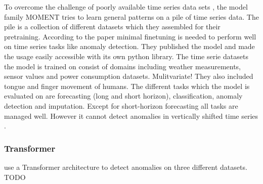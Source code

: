 \cite{han_learning_2022}

\cite{pham_mst-vae_2022}

\cite{mou_deep_2023}

\cite{kieu_anomaly_2022}

\cite{thill_temporal_2021}

\cite{wang_multiscale_2023}

\cite{chen_adversarial_2023}

\cite{gao_tsmae_2023}

\cite{gong_autoencoder-based_2022}

\cite{wang_attention-based_2022}

To overcome the challenge of poorly available time series data sets \cite{ma_survey_2023}, the model family MOMENT tries to learn general patterns on a pile of time series data. The pile is a collection of different datasets which they assembled for their pretraining. According to the paper minimal finetuning is needed to perform well on time series tasks like anomaly detection. They published the model and made the usage easily accessible with its own python library. The time serie datasets the model is trained on consist of domains including weather measurements, sensor values and power consumption datasets. Mulitvariate! They also included tongue and finger movement of humans. The different tasks which the model is evaluated on are forecasting (long and short horizon), classification, anomaly detection and imputation. Except for short-horizon forecasting all tasks are managed well. However it cannot detect anomalies in vertically shifted time series \cite{goswami_moment_2024}.

\subsubsection{Transformer}
\cite{xu_anomaly_2022} use a Transformer architecture to detect anomalies on three different datasets. TODO



\cite{wu_decompose_2023}

\cite{doshi_tisat_2022}

\cite{peng_tcf-trans_2023}

\cite{li_dct-gan_2023}

\cite{shin_time_2023}


